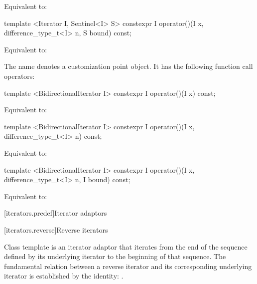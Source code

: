 \begin{itemdescr}
\pnum
\effects Equivalent to: 
\end{itemdescr}

\begin{itemdecl}
template <Iterator I, Sentinel<I> S>
  constexpr I operator()(I x, difference_type_t<I> n, S bound) const;
\end{itemdecl}

\begin{itemdescr}
\pnum
\effects Equivalent to: 
\end{itemdescr}

%
\pnum
The name  denotes a customization point object. It has the following function call operators:

\begin{itemdecl}
template <BidirectionalIterator I>
  constexpr I operator()(I x) const;
\end{itemdecl}

\begin{itemdescr}
\pnum
\effects Equivalent to: 
\end{itemdescr}

\begin{itemdecl}
template <BidirectionalIterator I>
  constexpr I operator()(I x, difference_type_t<I> n) const;
\end{itemdecl}

\begin{itemdescr}
\pnum
\effects Equivalent to: 
\end{itemdescr}

\begin{itemdecl}
template <BidirectionalIterator I>
  constexpr I operator()(I x, difference_type_t<I> n, I bound) const;
\end{itemdecl}

\begin{itemdescr}
\pnum
\effects Equivalent to: 
\end{itemdescr}

[iterators.predef]{Iterator adaptors}

[iterators.reverse]{Reverse iterators}

\pnum
Class template  is an iterator adaptor that iterates from the end of the sequence defined by its underlying iterator to the beginning of that sequence.
The fundamental relation between a reverse iterator and its corresponding underlying iterator
is established by the identity:
.

